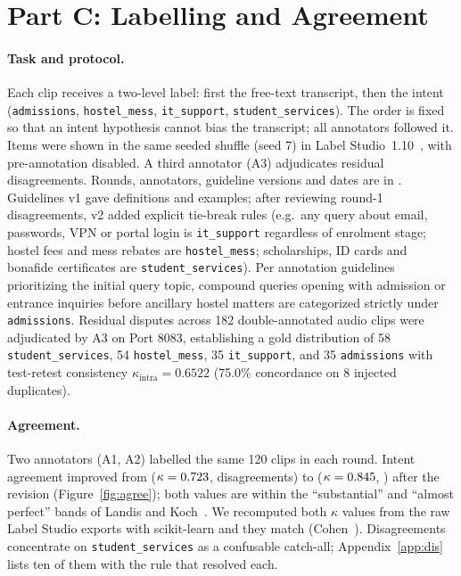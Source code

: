 \documentclass[sigconf,authordraft]{acmart}
\begin{document}
\section{Part C: Labelling and Agreement}\label{sec:label}
\paragraph{Task and protocol.}
Each clip receives a two-level label: first the free-text transcript, then the intent (\texttt{admissions}, \texttt{hostel\_mess}, \texttt{it\_support}, \texttt{student\_services}).
The order is fixed so that an intent hypothesis cannot bias the transcript; all annotators followed it. Items were shown in the same seeded shuffle (seed 7) in Label Studio~1.10~\cite{LabelStudio}, with pre-annotation disabled. A third annotator (A3) adjudicates residual disagreements. Rounds, annotators, guideline versions and dates are in .
Guidelines v1 gave definitions and examples; after reviewing round-1 disagreements, v2 added explicit tie-break rules (e.g.\ any query about email, passwords, VPN or portal login is \texttt{it\_support} regardless of enrolment stage; hostel fees and mess rebates are \texttt{hostel\_mess}; scholarships, ID cards and bonafide certificates are \texttt{student\_services}). Per annotation guidelines prioritizing the initial query topic, compound queries opening with admission or entrance inquiries before ancillary hostel matters are categorized strictly under \texttt{admissions}. Residual disputes across 182 double-annotated audio clips were adjudicated by A3 on Port 8083, establishing a gold distribution of 58 \texttt{student\_services}, 54 \texttt{hostel\_mess}, 35 \texttt{it\_support}, and 35 \texttt{admissions} with test-retest consistency $\kappa_{\text{intra}} = 0.6522$ (75.0\% concordance on 8 injected duplicates).

\paragraph{Agreement.}
Two annotators (A1, A2) labelled the same 120 clips in each round. Intent agreement improved from \AgrOne{} ($\kappa=0.723$, \DisOne{} disagreements) to \AgrTwo{} ($\kappa=0.845$, \DisTwo{}) after the revision (Figure~\ref{fig:agree}); both values are within the ``substantial'' and ``almost perfect'' bands of Landis and Koch~\cite{Landis1977}. We recomputed both $\kappa$ values from the raw Label Studio exports with scikit-learn and they match  (Cohen~\cite{Cohen1960}).
Disagreements concentrate on \texttt{student\_services} as a confusable catch-all; Appendix~\ref{app:dis} lists ten of them with the rule that resolved each.
\end{document}
